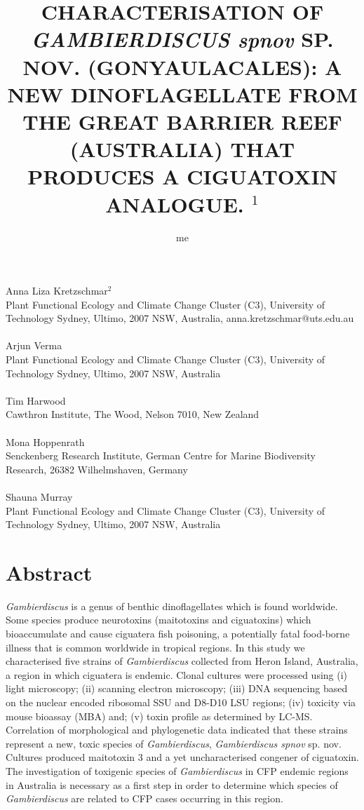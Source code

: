 \documentclass[12pt]{article}
\title{CHARACTERISATION OF \emph{GAMBIERDISCUS spnov} SP. NOV. (GONYAULACALES): A NEW DINOFLAGELLATE FROM THE GREAT BARRIER REEF (AUSTRALIA) THAT PRODUCES A CIGUATOXIN ANALOGUE. $^{1}$}
\author{me}
\date{}
\begin{document}
\maketitle
\paragraph{}Anna Liza Kretzschmar$^{2}$\\
Plant Functional Ecology and Climate Change Cluster (C3), University of Technology Sydney, Ultimo, 2007 NSW, Australia, anna.kretzschmar@uts.edu.au
\paragraph{}Arjun Verma \\
Plant Functional Ecology and Climate Change Cluster (C3), University of Technology Sydney, Ultimo, 2007 NSW, Australia
\paragraph{}Tim Harwood\\ 
Cawthron Institute, The Wood, Nelson 7010, New Zealand
\paragraph{}Mona Hoppenrath\\
Senckenberg Research Institute, German Centre for Marine Biodiversity Research, 26382 Wilhelmshaven, Germany
\paragraph{}Shauna Murray\\ 
Plant Functional Ecology and Climate Change Cluster (C3), University of Technology Sydney, Ultimo, 2007 NSW, Australia
\newpage
\section{Abstract}
\textit{Gambierdiscus} is a genus of benthic dinoflagellates which is found worldwide. Some species produce neurotoxins (maitotoxins and ciguatoxins) which  bioaccumulate and cause ciguatera fish poisoning, a potentially fatal food-borne illness that is common worldwide in tropical regions. In this study we characterised five strains of \textit{Gambierdiscus} collected from Heron Island,  Australia, a region in which ciguatera is endemic. Clonal cultures were processed using (i) light microscopy; (ii) scanning electron microscopy; (iii) DNA sequencing based on the nuclear encoded ribosomal  SSU and D8-D10 LSU regions; (iv) toxicity via mouse bioassay (MBA) and; (v) toxin profile as determined by LC-MS. Correlation of morphological and phylogenetic data indicated that these strains represent a new, toxic species of \emph{Gambierdiscus}, \emph{Gambierdiscus spnov} sp. nov. Cultures produced maitotoxin 3 and a yet uncharacterised congener of ciguatoxin. The investigation of toxigenic species of \textit{Gambierdiscus} in CFP endemic regions in Australia is necessary as a first step in order to determine which species of \textit{Gambierdiscus} are related to CFP cases occurring in this region.
\end{document}
